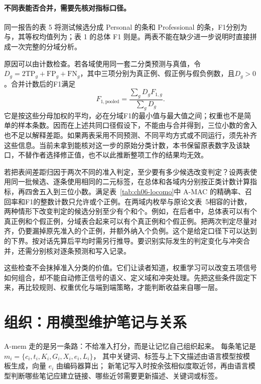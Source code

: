 \paragraph{不同表能否合并，需要先核对指标口径。}
同一报告的表 5 将测试候选分成 Personal 的条和 Professional 的条，F1分别为与，其等权均值列为；表 1 的总体 F1 则是\cite{amac-2603}。两表不能在缺少进一步说明时直接拼成一次完整的分域分析。

原因可以由计数检查。若各域使用同一套二分类预测与真值，令$D_g=2\mathrm{TP}_g+\mathrm{FP}_g+\mathrm{FN}_g$，其中三项分别为真正例、假正例与假负例数，且$D_g>0$。合并计数后的F1满足
\[
 F_{1,\mathrm{pooled}}=\frac{\sum_gD_gF_{1,g}}{\sum_gD_g}.
\]
它是按这些分母加权的平均，必在分域F1的最小值与最大值之间；权重也不是简单的样本条数。因而在上述共同口径假设下，不能由与合并得到，三位小数的舍入也不足以解释差距。如果两表采用不同预测、不同平均方式或不同运行，须先补齐这些信息。当前未拿到能核对这一步的原始分类计数，本书保留原表数字及该缺口，不替作者选择修正值，也不以此推断整项工作的结果均无效。

若把表间差距归因于两次不同的准入判定，至少要有多少候选改变判定？设两表使用同一批候选、逐条使用相同的二元标签，在总体和各域内分别按正类计数计算指标，再四舍五入到三位小数。满足表~\ref{tab:ch06-locomo}中 A-MAC 的精确率、召回率和F1的整数计数只允许或个正例。在两域内枚举与原论文表~5相容的计数，两种情形下改变判定的候选分别至少有个和个。例如，在后者中，总体表可以有个真正例和个假正例，分域表合起来可以有个真正例和个假正例。把两次判定尽量对齐，仍要漏掉原先准入的个正例，并额外纳入个负例。这个是给定口径下可以达到的下界。按对话先算后平均时需另行推导。要识别实际发生的判定变化与冲突合并，还需分别核对逐条预测和写入记录。

这些检查不会抹掉准入分类的价值。它们让读者知道，权重学习可以改变五项信号如何组合，却不能自动修正信号的语义、定义域和冲突处理。先把这些条件固定下来，再比较规则、权重优化与端到端策略，才能判断收益来自哪一层。

\section{组织：用模型维护笔记与关系}
\label{sec:ch06-selforg}

A-mem 走的是另一条路：不给准入打分，而是让记忆自己组织起来。
每条笔记是 $m_i=\{c_i,t_i,K_i,G_i,X_i,e_i,L_i\}$，
其中关键词、标签与上下文描述由语言模型按模板生成，向量 $e_i$ 由编码器算出；
新笔记写入时按余弦相似度取近邻，再由语言模型判断哪些笔记应建立链接、哪些近邻需要更新描述、关键词或标签\cite{amem-2502}。

